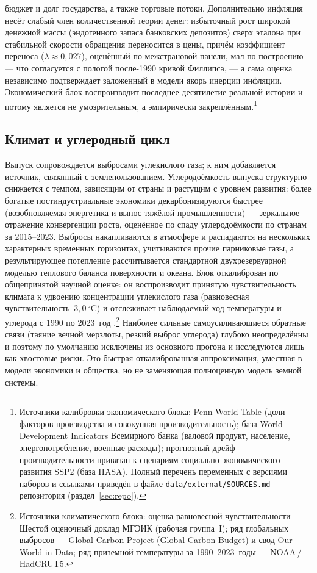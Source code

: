 \documentclass[11pt,a4paper]{article}
\begin{document}
бюджет и долг государства, а также торговые потоки. Дополнительно инфляция несёт слабый член
количественной теории денег: избыточный рост широкой денежной массы (эндогенного запаса банковских
депозитов) сверх эталона при стабильной скорости обращения переносится в цены, причём коэффициент
переноса ($\lambda\approx0{,}027$), оценённый по межстрановой панели, мал по построению --- что
согласуется с пологой после-1990 кривой Филлипса, --- а сама оценка независимо подтверждает
заложенный в модели якорь инерции инфляции. Экономический блок воспроизводит
последнее десятилетие реальной истории и потому является не умозрительным, а
эмпирически закреплённым.\footnote{Источники калибровки экономического блока: Penn World
Table (доли факторов производства и совокупная производительность); база World Development
Indicators Всемирного банка (валовой продукт, население, энергопотребление, военные расходы);
прогнозный дрейф производительности привязан к сценариям социально-экономического развития
SSP2 (база IIASA). Полный перечень переменных с версиями наборов и ссылками приведён в файле
\texttt{data/external/SOURCES.md} репозитория (раздел~\ref{sec:repo}).}

\subsection{Климат и углеродный цикл}

Выпуск сопровождается выбросами углекислого газа; к ним добавляется источник, связанный
с землепользованием. Углеродоёмкость выпуска структурно снижается с темпом, зависящим от страны и
растущим с уровнем развития: более богатые постиндустриальные экономики декарбонизируются быстрее
(возобновляемая энергетика и вынос тяжёлой промышленности) --- зеркальное отражение конвергенции
роста, оценённое по спаду углеродоёмкости по странам за 2015--2023. Выбросы накапливаются в атмосфере
и распадаются на нескольких характерных временных горизонтах, учитываются прочие парниковые газы, а
результирующее потепление рассчитывается стандартной двухрезервуарной моделью теплового баланса
поверхности и
океана. Блок откалиброван по общепринятой научной оценке: он воспроизводит принятую
чувствительность климата к удвоению концентрации углекислого газа (равновесная
чувствительность~$3{,}0$\,$^\circ$C) и отслеживает наблюдаемый ход температуры и
углерода с 1990 по 2023~год \citep{ipcc_ar6_wg1,friedlingstein2023}.\footnote{Источники
климатического блока: оценка равновесной чувствительности --- Шестой оценочный доклад МГЭИК
(рабочая группа~I); ряд глобальных выбросов --- Global Carbon Project (Global Carbon Budget) и
свод Our World in Data; ряд приземной температуры за 1990--2023~годы --- NOAA\,/\,HadCRUT5.}
Наиболее сильные
самоусиливающиеся обратные связи (таяние вечной мерзлоты, резкий выброс углерода) глубоко
неопределённы и поэтому по умолчанию исключены из основного прогона и исследуются лишь как
хвостовые риски. Это быстрая откалиброванная аппроксимация, уместная в модели экономики и
общества, но не заменяющая полноценную модель земной системы.
\end{document}
